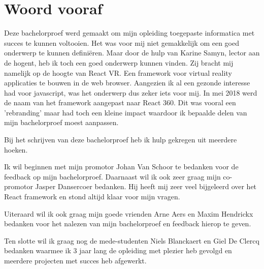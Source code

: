 
\chapter*{Woord vooraf}
\label{ch:voorwoord}


Deze bachelorproef werd gemaakt om mijn opleiding toegepaste informatica met succes te kunnen voltooien. Het was voor mij niet gemakkelijk om een goed onderwerp te kunnen definiëren. Maar door de hulp van Karine Samyn, lector aan de hogent, heb ik toch een goed onderwerp kunnen vinden. Zij bracht mij namelijk op de hoogte van React VR. Een framework voor virtual reality applicaties te bouwen in de web browser. Aangezien ik al een gezonde interesse had voor javascript, was het onderwerp dus zeker iets voor mij. In mei 2018 werd de naam van het framework aangepast naar React 360. Dit was vooral een 'rebranding' maar had toch een kleine impact waardoor ik bepaalde delen van mijn bachelorproef moest aanpassen.

Bij het schrijven van deze bachelorproef heb ik hulp gekregen uit meerdere hoeken.

Ik wil beginnen met mijn promotor Johan Van Schoor te bedanken voor de feedback op mijn bachelorproef. Daarnaast wil ik ook zeer graag mijn co-promotor Jasper Dansercoer bedanken. Hij heeft mij zeer veel bijgeleerd over het React framework en stond altijd klaar voor mijn vragen.

Uiteraard wil ik ook graag mijn goede vrienden Arne Aers en Maxim Hendrickx bedanken voor het nalezen van mijn bachelorproef en feedback hierop te geven.

Ten slotte wil ik graag nog de mede-studenten  Niels Blanckaert en Giel De Clercq bedanken waarmee ik 3 jaar lang de opleiding met plezier heb gevolgd en meerdere projecten met succes heb afgewerkt.